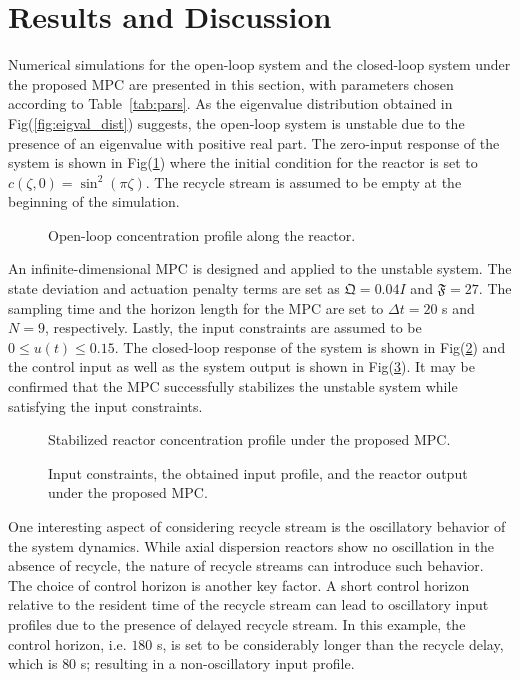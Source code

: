 \section{Results and Discussion}

Numerical simulations for the open-loop system and the closed-loop system under the proposed MPC are presented in this section, with parameters chosen according to Table~\ref{tab:pars}. As the eigenvalue distribution obtained in Fig(\ref{fig:eigval_dist}) suggests, the open-loop system is unstable due to the presence of an eigenvalue with positive real part. The zero-input response of the system is shown in Fig(\ref{fig:openloop_response}) where the initial condition for the reactor is set to $c(\zeta,0) = \sin^2(\pi \zeta)$. The recycle stream is assumed to be empty at the beginning of the simulation.

\begin{figure}[!htbp]
    \centering
    
    \caption{Open-loop concentration profile along the reactor.}
    \label{fig:openloop_response}
\end{figure}

An infinite-dimensional MPC is designed and applied to the unstable system. The state deviation and actuation penalty terms are set as $\mathfrak{Q} = 0.04 I$ and $\mathfrak{F} = 27$. The sampling time and the horizon length for the MPC are set to $\Delta t = 20$ s and $N = 9$, respectively. Lastly, the input constraints are assumed to be $0 \leq u(t) \leq 0.15$. The closed-loop response of the system is shown in Fig(\ref{fig:closedloop_response}) and the control input as well as the system output is shown in Fig(\ref{fig:control_input}). It may be confirmed that the MPC successfully stabilizes the unstable system while satisfying the input constraints.

\begin{figure}[!htbp]
    \centering
    
    \caption{Stabilized reactor concentration profile under the proposed MPC.}
    \label{fig:closedloop_response}
\end{figure}

\begin{figure}[!htbp]
    \centering
    
    \caption{Input constraints, the obtained input profile, and the reactor output under the proposed MPC.}
    \label{fig:control_input}
\end{figure}

One interesting aspect of considering recycle stream is the oscillatory behavior of the system dynamics. While axial dispersion reactors show no oscillation in the absence of recycle, the nature of recycle streams can introduce such behavior. The choice of control horizon is another key factor. A short control horizon relative to the resident time of the recycle stream can lead to oscillatory input profiles due to the presence of delayed recycle stream. In this example, the control horizon, i.e. $180$ s, is set to be considerably longer than the recycle delay, which is $80$ s; resulting in a non-oscillatory input profile.